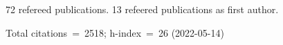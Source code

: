 72 refereed publications. 13 refeered publications as first author.

Total citations~=~2518; h-index~=~26 (2022-05-14)